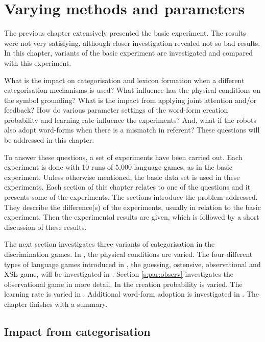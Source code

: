\chapter{Varying methods and parameters} \label{ch:lex}\label{ch:cat}\label{ch:interaction}\label{ch:feedback}\label{ch:par}

The previous chapter extensively presented the basic experiment. The results were not very satisfying, although closer investigation revealed not so bad results. In this chapter, variants of the basic experiment are investigated and compared with this experiment.

What is the impact on categorisation and lexicon formation when a different categorisation mechanisms is used? What influence has the physical conditions on the symbol grounding? What is the impact from applying joint attention and/or feedback? How do various parameter settings of the word-form creation probability and learning rate influence the experiments? And, what if the robots also adopt word-forms when there is a mismatch in referent? These questions will be addressed in this chapter.

To answer these questions, a set of experiments have been carried out. Each experiment is done with 10 runs of 5,000 language games, as in the basic experiment. Unless otherwise mentioned, the basic data set is used in these experiments. Each section of this chapter relates to one of the questions and it presents some of the experiments. The sections introduce the problem addressed. They describe the difference(s) of the experiments, usually in relation to the basic experiment. Then the experimental results are given, which is followed by a short discussion of these results.


The next section investigates three variants of categorisation in the discrimination games. In , the physical conditions are varied. The four different types of language games introduced in , the guessing, ostensive, observational and XSL game, will be investigated in . Section \ref{s:par:observ} investigates the observational game in more detail. In  the creation probability is varied. The learning rate is varied in . Additional word-form adoption is investigated in . The chapter finishes with a summary.

\section{Impact from categorisation}\label{s:par:cat}

